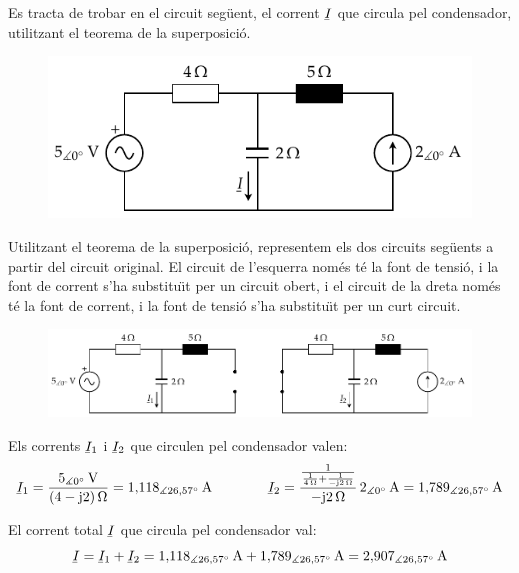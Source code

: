 \begin{exemple}
    Es tracta de trobar en el circuit seg\"{u}ent, el corrent $\cmplx{I}$ que circula
    pel condensador, utilitzant el teorema de la superposici\'{o}.
    \begin{figure}[htb]
        \centering
        \includegraphics{Imatges/Cap-Fonaments-Exemple-Superposicio-1.pdf}
    \end{figure}

    Utilitzant el teorema de la superposici\'{o}, representem els dos
    circuits seg\"{u}ents a partir del circuit original. El circuit de
    l'esquerra nom\'{e}s t\'{e} la font de tensi\'{o}, i la font de corrent s'ha
    substitu\"{\i}t per un circuit obert, i el circuit de
    la dreta nom\'{e}s t\'{e} la font de corrent,  i la font de tensi\'{o}  s'ha
    substitu\"{\i}t per un curt circuit.
    \begin{figure}[htb]
        \centering
        \includegraphics{Imatges/Cap-Fonaments-Exemple-Superposicio-2.pdf}
    \end{figure}

    Els corrents $\cmplx{I}_1$ i $\cmplx{I}_2$ que circulen pel condensador valen:
    \[
        \cmplx{I}_1 = \frac{5_{\measuredangle 0\degree}\unit{V}}{(4-\ju
        2)\unit{\ohm}} = 1{,}118_{\measuredangle
        26{,}57\degree}\unit{A} \qquad\qquad
        \cmplx{I}_2 = \frac{\frac{1}{\frac{1}{4\unit{\ohm}}+\frac{1}{-\ju 2\unit{\ohm}}}}
        {-\ju 2\unit{\ohm}} \, 2_{\measuredangle 0\degree}\unit{A} = 1{,}789_{\measuredangle
        26{,}57\degree}\unit{A}
    \]

    El corrent total $\cmplx{I}$ que circula pel condensador val:
    \[
        \cmplx{I}  = \cmplx{I}_1 + \cmplx{I}_2 = 1{,}118_{\measuredangle
        26{,}57\degree}\unit{A} + 1{,}789_{\measuredangle
        26{,}57\degree}\unit{A} =
        2{,}907_{\measuredangle 26{,}57\degree}\unit{A}
    \]
\end{exemple}


